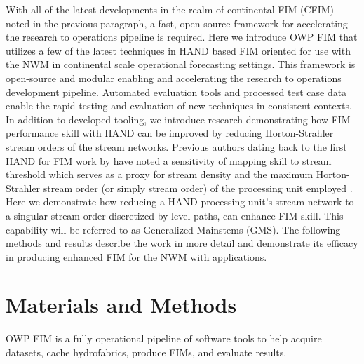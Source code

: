 \documentclass[draft]{dependencies/agujournal2019}
\begin{document}
With all of the latest developments in the realm of continental FIM (CFIM) noted in the previous paragraph, a fast, open-source framework for accelerating the research to operations pipeline is required.
Here we introduce OWP FIM that utilizes a few of the latest techniques in HAND based FIM oriented for use with the NWM in continental scale operational forecasting settings. 
This framework is open-source and modular enabling and accelerating the research to operations development pipeline.
Automated evaluation tools and processed test case data enable the rapid testing and evaluation of new techniques in consistent contexts.
In addition to developed tooling, we introduce research demonstrating how FIM performance skill with HAND can be improved by reducing Horton-Strahler stream orders \cite{horton1945erosional,strahler1952hypsometric,strahler1952hypsometric} of the stream networks.
Previous authors dating back to the first HAND for FIM work by  have noted a sensitivity of mapping skill to stream threshold which serves as a proxy for stream density and the maximum Horton-Strahler stream order (or simply stream order) of the processing unit employed \cite{zhang2018comparative,mcgehee2016modified,li2020evaluation}.
Here we demonstrate how reducing a HAND processing unit's stream network to a singular stream order discretized by level paths, can enhance FIM skill.
This capability will be referred to as Generalized Mainstems (GMS).
The following methods and results describe the work in more detail and demonstrate its efficacy in producing enhanced FIM for the NWM with applications.
%
\clearpage %

\section{Materials and Methods}
%
OWP FIM is a fully operational pipeline of software tools to help acquire datasets, cache hydrofabrics, produce FIMs, and evaluate results.
%
\end{document}
